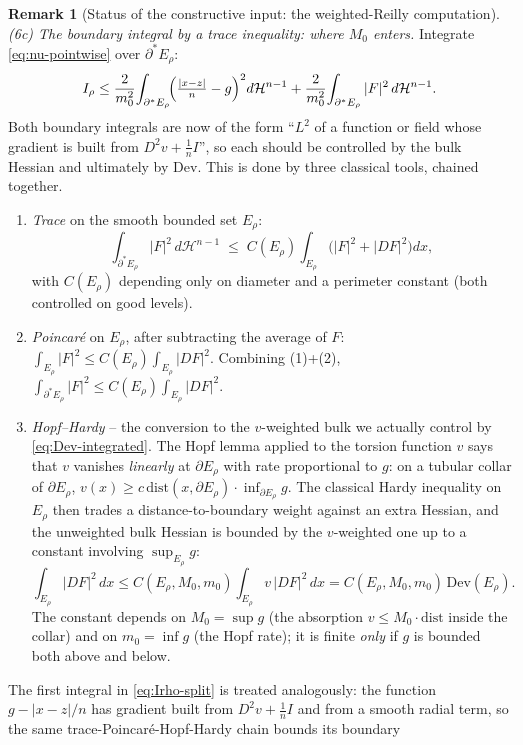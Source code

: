 \documentclass[11pt]{amsart}
\theoremstyle{definition}
\newtheorem{remark}[theorem]{Remark}
\newcommand{\Hn}{\mathcal H^{n-1}}
\begin{document}
\begin{remark}[Status of the constructive input: the weighted-Reilly computation]
\emph{(6c) The boundary integral by a trace inequality: where \(M_0\) enters.}
Integrate \eqref{eq:nu-pointwise} over \(\partial^*E_\rho\):
\begin{equation}\label{eq:Irho-split}
   I_\rho\le\frac{2}{m_0^2}\!\int_{\partial^*E_\rho}\!\Bigl(\tfrac{|x-z|}{n}-g\Bigr)^2 d\Hn
        +\frac{2}{m_0^2}\!\int_{\partial^*E_\rho}|F|^2\,d\Hn .
\end{equation}
Both boundary integrals are now of the form ``\(L^2\) of a function or field
whose gradient is built from \(D^2v+\tfrac1n I\)'', so each should be controlled
by the bulk Hessian and ultimately by \(\mathrm{Dev}\).  This is done by three
classical tools, chained together.
\begin{enumerate}[leftmargin=2.4em]
\item \emph{Trace} on the smooth bounded set \(E_\rho\):
\[
   \int_{\partial^*E_\rho}|F|^2\,d\Hn
   \;\le\;C(E_\rho)\!\int_{E_\rho}\bigl(|F|^2+|DF|^2\bigr)dx ,
\]
with \(C(E_\rho)\) depending only on diameter and a perimeter constant (both
controlled on good levels).
\item \emph{Poincaré} on \(E_\rho\), after subtracting the average of \(F\):
\(\int_{E_\rho}|F|^2\le C(E_\rho)\int_{E_\rho}|DF|^2\).  Combining (1)+(2),
\(\int_{\partial^*E_\rho}|F|^2\le C(E_\rho)\!\int_{E_\rho}|DF|^2\).
\item \emph{Hopf--Hardy} -- the conversion to the \(v\)-weighted bulk we
actually control by \eqref{eq:Dev-integrated}.  The Hopf lemma applied to the
torsion function \(v\) says that \(v\) vanishes \emph{linearly} at
\(\partial E_\rho\) with rate proportional to \(g\): on a tubular collar of
\(\partial E_\rho\), \(v(x)\ge c\,\mathrm{dist}(x,\partial E_\rho)\cdot
\inf_{\partial E_\rho}g\).  The classical Hardy inequality on \(E_\rho\) then
trades a distance-to-boundary weight against an extra Hessian, and the
unweighted bulk Hessian is bounded by the \(v\)-weighted one up to a constant
involving \(\sup_{E_\rho}g\):
\[
   \int_{E_\rho}|DF|^2\,dx
   \le C(E_\rho,M_0,m_0)\!\int_{E_\rho}v\,|DF|^2\,dx
   =C(E_\rho,M_0,m_0)\,\mathrm{Dev}(E_\rho).
\]
The constant depends on \(M_0=\sup g\) (the absorption \(v\le M_0\cdot
\mathrm{dist}\) inside the collar) and on \(m_0=\inf g\) (the Hopf rate); it is
finite \emph{only} if \(g\) is bounded both above and below.
\end{enumerate}
The first integral in \eqref{eq:Irho-split} is treated analogously: the function
\(g-|x-z|/n\) has gradient built from \(D^2v+\tfrac1n I\) and from a smooth
radial term, so the same trace-Poincaré-Hopf-Hardy chain bounds its boundary

\end{remark}
\end{document}
